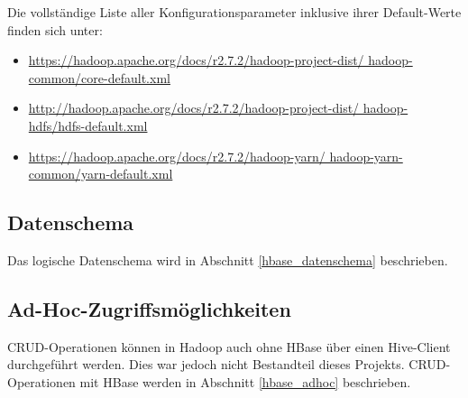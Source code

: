 Die vollständige Liste aller Konfigurationsparameter inklusive ihrer Default-Werte finden sich unter:

\begin{itemize}
	\item \url{https://hadoop.apache.org/docs/r2.7.2/hadoop-project-dist/
	hadoop-common/core-default.xml}
	\item \url{http://hadoop.apache.org/docs/r2.7.2/hadoop-project-dist/
	hadoop-hdfs/hdfs-default.xml}
	\item \url{https://hadoop.apache.org/docs/r2.7.2/hadoop-yarn/
	hadoop-yarn-common/yarn-default.xml}
\end{itemize}


\subsection{Datenschema}
Das logische Datenschema wird in Abschnitt \ref{hbase_datenschema}  beschrieben.


\subsection{Ad-Hoc-Zugriffsmöglichkeiten}
CRUD-Operationen können in Hadoop auch ohne HBase über einen Hive-Client durchgeführt werden. Dies war jedoch nicht Bestandteil dieses Projekts. CRUD-Operationen mit HBase werden in Abschnitt \ref{hbase_adhoc} beschrieben.
